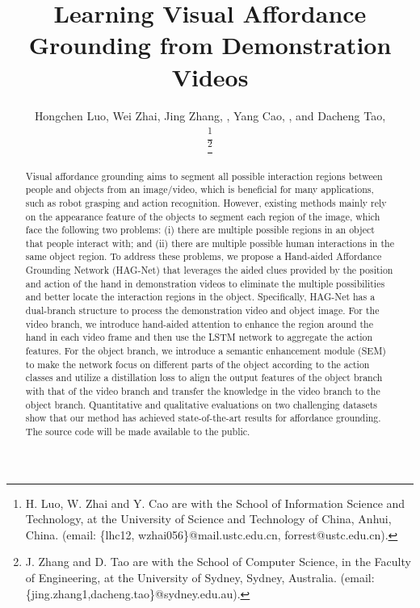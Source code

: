 \documentclass[journal,twoside]{IEEEtran}
\begin{document}
\title{Learning Visual Affordance Grounding from Demonstration Videos}

\author{Hongchen Luo, Wei Zhai, Jing Zhang, , Yang Cao, , and Dacheng Tao, 

\thanks{H. Luo, W. Zhai and Y. Cao are with the School of Information Science and Technology, at the University of Science and Technology of China, Anhui, China. (email: \{lhc12, wzhai056\}@mail.ustc.edu.cn, forrest@ustc.edu.cn).}


\thanks{J. Zhang and D. Tao are with the School of Computer Science, in the Faculty of Engineering, at the University of Sydney, Sydney, Australia. (email: \{jing.zhang1,dacheng.tao\}@sydney.edu.au).}

}


\maketitle

\begin{abstract}
Visual affordance grounding aims to segment all possible interaction regions between people and objects from an image/video, which is beneficial for many applications, such as robot grasping and action recognition. However, existing methods mainly rely on the appearance feature of the objects to segment each region of the image, which face the following two problems: (i) there are multiple possible regions in an object that people interact with; and (ii) there are multiple possible human interactions in the same object region. To address these problems, we propose a Hand-aided Affordance Grounding Network (HAG-Net) that leverages the aided clues provided by the position and action of the hand in demonstration videos to eliminate the multiple possibilities and better locate the interaction regions in the object. Specifically, HAG-Net has a dual-branch structure to process the demonstration video and object image. For the video branch, we introduce hand-aided attention to enhance the region around the hand in each video frame and then use the LSTM network to aggregate the action features. For the object branch, we introduce a semantic enhancement module (SEM) to make the network focus on different parts of the object according to the action classes and utilize a distillation loss to align the output features of the object branch with that of the video branch and transfer the knowledge in the video branch to the object branch. Quantitative and qualitative evaluations on two challenging datasets show that our method has achieved state-of-the-art results for affordance grounding. The source code will be made available to the public.
\end{abstract}
\end{document}
